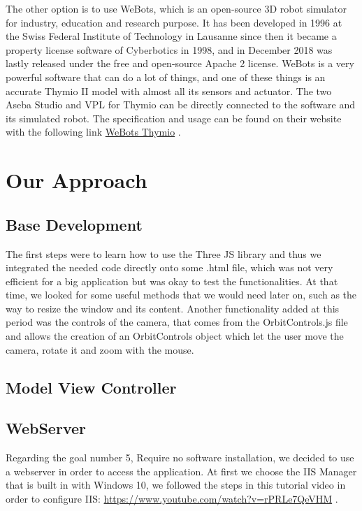 \documentclass{scrbook}
\begin{document}
The other option is to use WeBots, which is an open-source 3D robot simulator for industry, education and research purpose. 
It has been developed in 1996 at the Swiss Federal Institute of Technology in Lausanne since then it became a property license software of Cyberbotics in 1998, 
and in December 2018 was lastly released under the free and open-source Apache 2 license.
WeBots is a very powerful software that can do a lot of things, and one of these things is an accurate Thymio II model with almost all its sensors and actuator. 
The two Aseba Studio and VPL for Thymio can be directly connected to the software and its simulated robot. 
The specification and usage can be found on their website with the following link \href{https://www.cyberbotics.com/doc/guide/thymio2#mosybas-thymio-ii}{WeBots Thymio} .

\chapter{Our Approach}

\section{Base Development}

The first steps were to learn how to use the Three JS library and thus we integrated the needed code directly onto some .html file, which was not very efficient for a big application but was okay to test the functionalities. 
At that time, we looked for some useful methods that we would need later on, such as the way to resize the window and its content. Another functionality added at this period was the controls of the camera, that comes from the OrbitControls.js file and allows the creation of an OrbitControls object which let the user move the camera, rotate it and zoom with the mouse.

\section{Model View Controller}


\section{WebServer \label{webserver}}
Regarding the goal number 5, Require no software installation, we decided to use a webserver in order to access the application. At first we choose the IIS Manager that is built in with Windows 10, 
we followed the steps in this tutorial video in order to configure IIS: \url{https://www.youtube.com/watch?v=rPRLe7QeVHM} .
\end{document}
